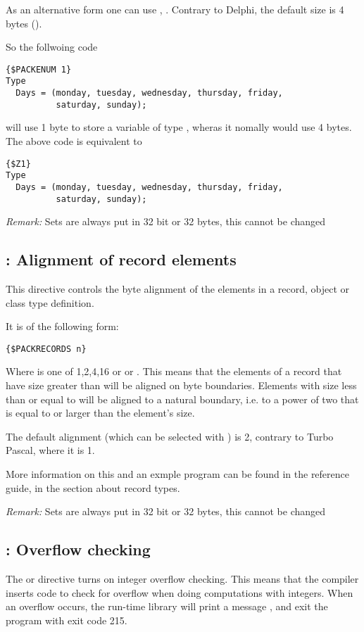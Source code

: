 \documentclass{report}
\begin{document}
As an alternative form one can use , 
. Contrary to Delphi, the default size is 4 bytes
().

So the follwoing code
\begin{verbatim}
{$PACKENUM 1}
Type
  Days = (monday, tuesday, wednesday, thursday, friday,
          saturday, sunday);
\end{verbatim}
will use 1 byte to store a variable of type , wheras it nomally
would use 4 bytes. The above code is equivalent to
\begin{verbatim}
{$Z1}
Type
  Days = (monday, tuesday, wednesday, thursday, friday,
          saturday, sunday);
\end{verbatim}

{\em Remark:}
Sets are always put in 32 bit or 32 bytes, this cannot be changed

\subsection{ : Alignment of record elements}

This directive controls the byte alignment of the elements in a record,
object or class type definition.

It is of the following form:
\begin{verbatim}
{$PACKRECORDS n}
\end{verbatim}

Where  is one of 1,2,4,16 or  or .
This means that the elements of a record that have size greater than 
will be aligned on  byte boundaries. Elements with size less than or
equal to  will be aligned to a natural boundary, i.e. to a power of
two that is equal to or larger than the element's size.

The default alignment (which can be selected with ) is 2,
contrary to Turbo Pascal, where it is 1.

More information on this and an exmple program can be found in the reference
guide, in the section about record types.

{\em Remark:}
Sets are always put in 32 bit or 32 bytes, this cannot be changed

\subsection{ : Overflow checking}
The  or  directive turns on
integer overflow checking. This means that the compiler inserts code
to check for overflow when doing computations with integers.
When an overflow occurs, the run-time library will print a message
, and exit the program with exit code 215.
\end{document}
